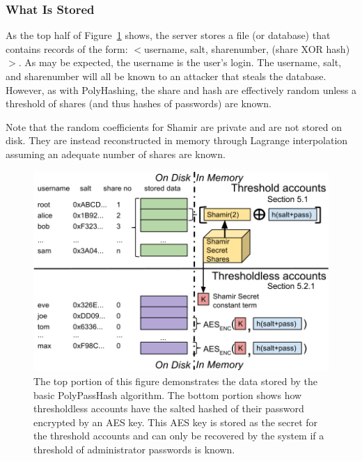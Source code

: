 \subsubsection{What Is Stored}

As the top half of Figure~\ref{fig-polypasshashoverview} shows, the server 
stores a file (or database) that contains records of the form:
$<$username, salt, sharenumber, (share XOR hash)$>$.   As may be 
expected, the username is the user's login.   The username, salt, and 
sharenumber
will all be known to an attacker that steals the database.   However,
as with PolyHashing, the share and hash are effectively random 
unless a threshold of shares (and thus hashes of passwords) are
known.

Note that the random coefficients for Shamir are private and are not stored on 
disk.   They are instead reconstructed in memory through Lagrange 
interpolation assuming an adequate number of shares are known.

\begin{figure}
\center
\begin{minipage}[b]{1.05\linewidth}
\includegraphics[width=\columnwidth]{figures/polypasshashoverview.png}
\end{minipage}
\caption{The top portion of this figure demonstrates the data stored
by the basic PolyPassHash algorithm.   The bottom portion shows how
thresholdless accounts have the salted hashed of their password
encrypted by an AES key.   This AES key is stored as the secret for the 
threshold accounts and can only be recovered by the system if a threshold
of administrator passwords is known.}
\label{fig-polypasshashoverview}
\end{figure}


